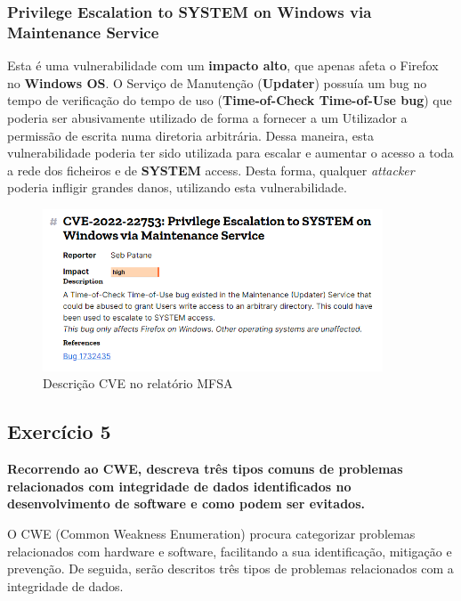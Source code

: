 \documentclass[11t]{article}
\begin{document}
\subsubsection*{\textbf{Privilege Escalation to SYSTEM on Windows via Maintenance Service}}

Esta é uma vulnerabilidade com um \textbf{impacto alto}, que apenas afeta o Firefox no \textbf{Windows OS}. O Serviço de Manutenção (\textbf{Updater}) possuía um bug no tempo de verificação do tempo de uso (\textbf{Time-of-Check Time-of-Use bug}) que poderia ser abusivamente utilizado de forma a fornecer a um Utilizador a permissão de escrita numa diretoria arbitrária. Dessa maneira, esta vulnerabilidade poderia ter sido utilizada para escalar e aumentar o acesso a toda a rede dos ficheiros e de \textbf{SYSTEM} access. Desta forma, qualquer \textit{attacker} poderia infligir grandes danos, utilizando esta vulnerabilidade.

\begin{figure}[H]
    \centering
    \includegraphics[width=0.9\textwidth]{images/descricaoPergunta4-3.png}
    \caption{Descrição CVE no relatório MFSA}
\end{figure}



\clearpage
\subsection{Exercício 5}
\textbf{Recorrendo ao CWE, descreva três tipos comuns de problemas relacionados com integridade de dados identificados no desenvolvimento de software e como podem ser evitados.}

\vspace{0.5cm}

O CWE (Common Weakness Enumeration) procura categorizar problemas relacionados com hardware e software, facilitando a sua identificação, mitigação e prevenção. De seguida, serão descritos três tipos de problemas relacionados com a integridade de dados.
\end{document}
